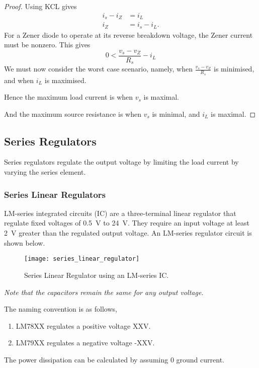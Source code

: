 \documentclass{article}
\begin{document}
\begin{proof}
    Using KCL gives
    \begin{align*}
        i_s - i_Z & = i_L        \\
        i_Z       & = i_s - i_L.
    \end{align*}
    For a Zener diode to operate at its reverse breakdown voltage, the Zener current
    must be nonzero. This gives
    \begin{equation*}
        0 < \frac{v_s - v_Z}{R_s} - i_L
    \end{equation*}
    We must now consider the worst case scenario, namely, when
    $\displaystyle \frac{v_s - v_Z}{R_s}$ is minimised, and when $i_L$ is maximised.

    Hence the maximum load current is when $v_s$ is maximal.

    And the maximum source resistance is when $v_s$ is minimal, and $i_L$ is maximal.
\end{proof}
\subsection{Series Regulators}
\begin{definition}
    Series regulators regulate the output voltage by limiting the load current by varying the series element.
\end{definition}
\subsubsection{Series Linear Regulators}
LM-series integrated circuits (IC) are a three-terminal linear regulator that regulate fixed voltages of \SI{0.5}{\volt} to \SI{24}{\volt}.
They require an input voltage at least \SI{2}{\volt} greater than the regulated output voltage.
An LM-series regulator circuit is shown below.
\begin{figure}[H]
    \centering
    \texttt{[image: series\_linear\_regulator]}
    \caption{Series Linear Regulator using an LM-series IC.}
\end{figure}
\emph{Note that the capacitors remain the same for any output voltage.}

The naming convention is as follows,
\begin{enumerate}
    \item LM78XX regulates a positive voltage XX\si{\volt}.
    \item LM79XX regulates a negative voltage -XX\si{\volt}.
\end{enumerate}
The power dissipation can be calculated by assuming 0 ground current.
\end{document}
